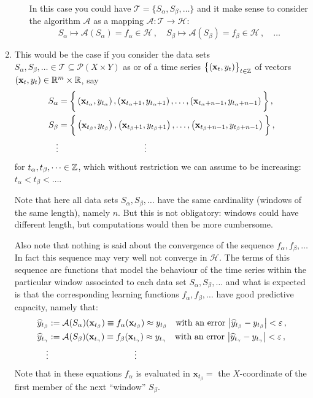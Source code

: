 \begin{description}[style=unboxed,leftmargin=0cm,itemsep=3ex]
\begin{enumerate}
\begin{itemize}
In this case you could have 
$\mathscr{T}=\big\{ S_\alpha,S_\beta,\dots\big\}$
and it make sense to consider the algorithm $\mathcal{A}$ as a mapping
$\mathcal{A}:\mathscr{T}\to\mathscr{H}$:
$$
S_\alpha\mapsto \mathcal{A}(S_\alpha)=f_\alpha\in\mathscr{H}\,,\quad
S_\beta \mapsto \mathcal{A}(S_\beta )=f_\beta \in\mathscr{H}\,,\quad\dots
$$
\end{itemize}


\item
{}
This would be the case if you consider the data sets 
$S_\alpha,S_\beta,\dots\in\mathscr{T}\subseteq\mathscr{P}(X\times Y)$
as  or  of a time series
$\big\{(\mathbf{x}_t,y_t)\big\}_{t\in{\mathbb Z }}$ of vectors 
$(\mathbf{x}_t,y_t)\in{\mathbb R }^m\times{\mathbb R }$, say
\begin{align*}
S_\alpha &= \bigg\{ 
\left( \mathbf{x}_{t_\alpha}, y_{t_\alpha} \right), 
\left( \mathbf{x}_{t_\alpha+1}, y_{t_\alpha+1} \right), \dots, 
\left( \mathbf{x}_{t_\alpha+n-1}, y_{t_\alpha+n-1} \right) \bigg\}\,, \\
S_\beta &= \bigg\{ 
\left( \mathbf{x}_{t_\beta}, y_{t_\beta} \right), 
\left( \mathbf{x}_{t_\beta+1}, y_{t_\beta+1} \right),\dots, 
\left( \mathbf{x}_{t_\beta+n-1}, y_{t_\beta+n-1} \right) \bigg\}\,, \\
\vdots & \rule{10em}{0ex}\vdots
\end{align*}
for $t_\alpha,t_\beta,\dots\in{\mathbb Z }$, which without restriction we can assume
to be increasing: $t_\alpha<t_\beta<\dots$.

Note that here all data sets $S_\alpha,S_\beta,\dots$ have the same cardinality
(windows of the same length), namely $n$.
But this is not obligatory: windows could have different length, but
computations would then be more cumbersome.

Also note that nothing is said about the convergence of the sequence
$f_\alpha,f_\beta,\dots$
In fact this sequence may very well not converge in $\mathscr{H}$.
The terms of this sequence are functions that model the behaviour of the
time series within the particular window associated to each data set
$S_\alpha,S_\beta,\dots$ and what is expected is that the corresponding
learning functions $f_\alpha,f_\beta,\dots$ have good predictive capacity,
namely that: 
\begin{align*}
\widehat{y}_{t_\beta}
&:= \mathcal{A}(S_\alpha)(\mathbf{x}_{t_\beta})
\equiv f_\alpha(\mathbf{x}_{t_\beta}) \approx y_{t_\beta} \quad
\text{with an error $\big|\widehat{y}_{t_\beta}-y_{t_\beta}\big|<\varepsilon$}\,, \\
\widehat{y}_{t_\gamma}
&:= \mathcal{A}(S_\beta)(\mathbf{x}_{t_\gamma})
\equiv f_\beta(\mathbf{x}_{t_\gamma}) \approx y_{t_\gamma} \quad
\text{with an error $\big|\widehat{y}_{t_\gamma}-y_{t_\gamma}\big|<\varepsilon$}\,, \\
\vdots & \rule{10em}{0ex}\vdots
\end{align*}
Note that in these equations $f_\alpha$ is evaluated in $\mathbf{x}_{t_\beta}=$
the $X$-coordinate of the first member of the next ``window'' $S_\beta$.


\end{enumerate}
\end{description}
